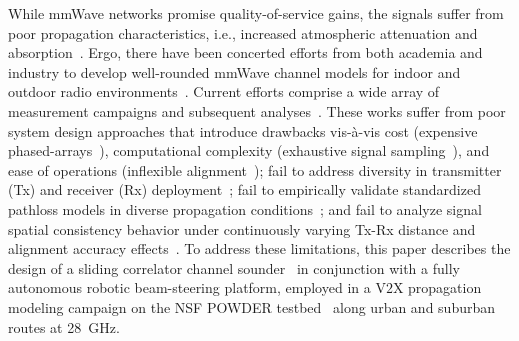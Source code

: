 \documentclass[10pt, twocolumn]{IEEEtran}
\begin{document}
While mmWave networks promise quality-of-service gains, the signals suffer from poor propagation characteristics, i.e., increased atmospheric attenuation and absorption~\cite{Rappaport}. Ergo, there have been concerted efforts from both academia and industry to develop well-rounded mmWave channel models for indoor and outdoor radio environments~\cite{Foliage, Indoor60G, NISTModeling}. Current efforts comprise a wide array of measurement campaigns and subsequent analyses~\cite{Agile-Link, Harvard, Purdue, Foliage, MolischSpatialOutdoor, Outdoor28G, Commercial, MacCartneySpatialStatistics}. These works suffer from poor system design approaches that introduce drawbacks vis-\`{a}-vis cost (expensive phased-arrays~\cite{Agile-Link}), computational complexity (exhaustive signal sampling~\cite{Agile-Link}), and ease of operations (inflexible alignment~\cite{Foliage}); fail to address diversity in transmitter (Tx) and receiver (Rx) deployment~\cite{Purdue, MolischSpatialOutdoor}; fail to empirically validate standardized pathloss models in diverse propagation conditions~\cite{Outdoor28G, Commercial}; and fail to analyze signal spatial consistency behavior under continuously varying Tx-Rx distance and alignment accuracy effects~\cite{Indoor60G, MolischSpatialOutdoor, MacCartneySpatialStatistics}. To address these limitations, this paper describes the design of a sliding correlator channel sounder~\cite{Purdue} in conjunction with a fully autonomous robotic beam-steering platform, employed in a V$2$X propagation modeling campaign on the NSF POWDER testbed~\cite{POWDER} along urban and suburban routes at \SI{28}{\giga\hertz}.
\end{document}
